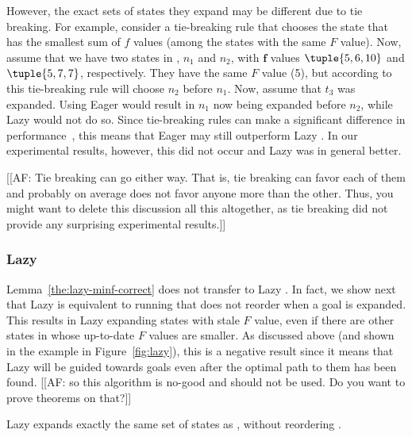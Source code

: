 However, the exact sets of states they expand may be different due to tie breaking.
For example, consider a tie-breaking rule that chooses the state that has the smallest sum of $f$ values (among the states with the same $F$ value).
Now, assume that we have two states in \open, $n_1$ and $n_2$, with $\mathbf{f}$ values $\tuple{5, 6, 10 }$ and $\tuple{5, 7, 7}$, respectively.
They have the same $F$ value (5), but according to this tie-breaking rule \kastarmin will choose $n_2$ before $n_1$.
Now, assume that $t_3$ was expanded.
Using Eager \kastarmin would result in $n_1$ now being expanded before $n_2$, while Lazy \kastarmin would not do so.
Since tie-breaking rules can make a significant difference in performance~\cite{asai2017tieBreaking}, this means that Eager \kastarmin may still outperform Lazy \kastarmin.
In our experimental results, however, this did not occur and Lazy \kastarmin was in general better. %

[[AF: Tie breaking can go either way. That is, tie breaking can favor each of them and probably on average does not favor anyone more than the other. Thus, you might want to delete this discussion all this altogether, as tie breaking did not provide any surprising experimental results.]]
\subsubsection{Lazy \kastarmax}

Lemma~\ref{the:lazy-minf-correct} does not transfer to Lazy \kastarmax.
In fact, we show next that Lazy \kastarmax is equivalent to running \kastarmax that does not reorder \open when a goal is expanded.
This results in Lazy \kastarmax expanding states with stale $F$ value, even if there are other states in \open whose up-to-date $F$ values are smaller.
As discussed above (and shown in the example in Figure~\ref{fig:lazy}), this is a negative result since it means that Lazy \kastarmax will be guided towards goals even after the optimal path to them has been found.
[[AF: so this algorithm is no-good and should not be used. Do you want to prove theorems on that?]]
\begin{theorem}%
  Lazy \kastarmax expands exactly the same set of states as \kastarmax, without reordering \open.
  \label{the:lazy-maxf-bad}
\end{theorem}

